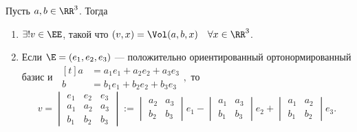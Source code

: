 \documentclass[a4paper]{article}
\begin{document}
\begin{colloq}
            \begin{theorem}
                \label{lec25:t}
                Пусть $a, b \in \RR^3$. Тогда
                \begin{enumerate}
                \item $\exists! v \in \EE$, такой что $(v, x) = \Vol(a, b, x) \quad \forall x \in \RR^3$.
                \item Если $\E = (e_1, e_2, e_3)$ --- положительно ориентированный ортонормированный базис и
                    \begin{math}
                        \ \begin{aligned}[t]
                            a &= a_1 e_1 + a_2 e_2 + a_3 e_3 \\
                            b &= b_1 e_1 + b_2 e_2 + b_3 e_3
                        \end{aligned},
                    \end{math}
                    то 
                    \begin{equation}
                        \tag{$\star$}
                        \label{lec25:v}
                        v = \begin{vmatrix}
                            e_1 & e_2 & e_3 \\
                            a_1 & a_2 & a_3 \\
                            b_1 & b_2 & b_3
                        \end{vmatrix}
                        := \begin{vmatrix} 
                            a_2 & a_3 \\
                            b_2 & b_3
                        \end{vmatrix} e_1 - \begin{vmatrix} 
                            a_1 & a_3 \\
                            b_1 & b_3
                        \end{vmatrix} e_2 + \begin{vmatrix} 
                            a_1 & a_2 \\
                            b_1 & b_2
                        \end{vmatrix} e_3
                    .\end{equation}
                \end{enumerate}
            \end{theorem}


\end{colloq}
\end{document}
